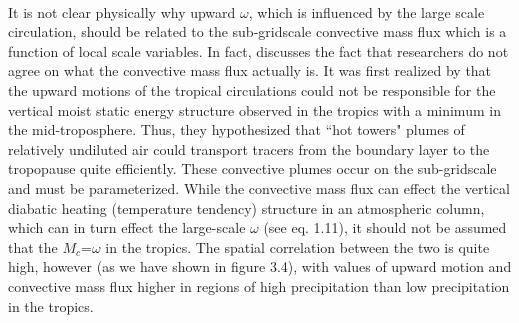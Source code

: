 \documentclass[letterpaper,12pt,titlepage,oneside,final]{book}
\begin{document}
\\
It is not clear physically why upward $\omega$, which is influenced by the large scale circulation, should be related to the sub-gridscale convective mass flux which is a function of local scale variables. In fact, \citep{yano_deep-convective_2009} discusses the fact that researchers do not agree on what the convective mass flux actually is. It was first realized by \citep{riehl_and_malkus_heat_1958} that the upward motions of the tropical circulations could not be responsible for the vertical moist static energy structure observed in the tropics with a minimum in the mid-troposphere. Thus, they hypothesized that ``hot towers" plumes of relatively undiluted air could transport tracers from the boundary layer to the tropopause quite efficiently. These convective plumes occur on the sub-gridscale and must be parameterized. While the convective mass flux can effect the vertical diabatic heating (temperature tendency) structure in an atmospheric column, which can in turn effect the large-scale $\omega$ (see eq. 1.11), it should not be assumed that the $M_{c}$=$\omega$ in the tropics. The spatial correlation between the two is quite high, however (as we have shown in figure 3.4), with values of upward motion and convective mass flux higher in regions of high precipitation than low precipitation in the tropics.
\end{document}
